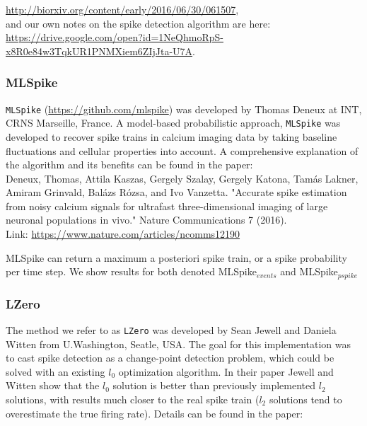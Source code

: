 \documentclass[a4paper,10pt,twocolumn]{article}
\begin{document}
\noindent \href{http://biorxiv.org/content/early/2016/06/30/061507}{http://biorxiv.org/content/early/2016/06/30/061507}, \\

\noindent and our own notes on the spike detection algorithm are here:\\

\noindent \href{https://drive.google.com/open?id=1NeQhmoRpS-x8R0e84w3TqkUR1PNMXiem6ZIjJta-U7A}{https://drive.google.com/open?id=1NeQhmoRpS-x8R0e84w3TqkUR1PNMXiem6ZIjJta-U7A}.

\subsubsection*{MLSpike}
\texttt{MLSpike} (\href{https://github.com/mlspike}{https://github.com/mlspike}) was developed by Thomas Deneux at INT, CRNS Marseille, France. A model-based probabilistic approach, \texttt{MLSpike} was developed to recover spike trains in calcium imaging data by taking baseline fluctuations and cellular properties into account. A comprehensive explanation of the algorithm and its benefits can be found in the paper:\\

\noindent Deneux, Thomas, Attila Kaszas, Gergely Szalay, Gergely Katona, Tamás Lakner, Amiram Grinvald, Balázs Rózsa, and Ivo Vanzetta. "Accurate spike estimation from noisy calcium signals for ultrafast three-dimensional imaging of large neuronal populations in vivo." Nature Communications 7 (2016).\\

\noindent Link: \href{https://www.nature.com/articles/ncomms12190}{https://www.nature.com/articles/ncomms12190}

MLSpike can return a maximum a posteriori spike train, or a spike probability per time step. We show results for both denoted MLSpike$_{events}$ and MLSpike$_{pspike}$

\subsubsection*{LZero}
The method we refer to as \texttt{LZero} was developed by Sean Jewell and Daniela Witten from U.Washington, Seatle, USA. The goal for this implementation was to cast spike detection as a change-point detection problem, which could be solved with an existing $l_{0}$ optimization algorithm. In their paper Jewell and Witten show that the $l_{0}$ solution is better than previously implemented $l_{2}$ solutions, with results much closer to the real spike train ($l_{2}$ solutions tend to overestimate the true firing rate). Details can be found in the paper:\\
\end{document}
